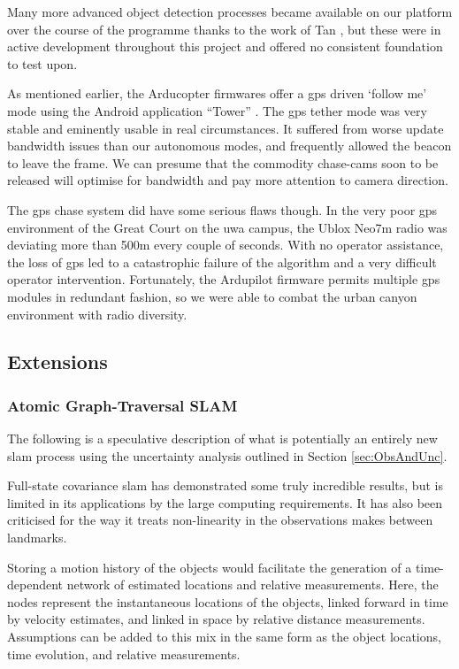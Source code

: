 \documentclass[a4paper, 11pt, titlepage]{article}
\newcounter{subsubsubsection}[subsubsection]
\begin{document}
        Many more advanced object detection processes became available on our platform over the course of the programme thanks to the work of Tan \cite{Tan}, but these were in active development throughout this project and offered no consistent foundation to test upon.

        As mentioned earlier, the Arducopter firmwares offer a \gls{gps} driven `follow me' mode using the Android application ``Tower'' \cite{3dr-tower}.
        The \gls{gps} tether mode was very stable and eminently usable in real circumstances.  It suffered from worse update bandwidth issues than our autonomous modes, and frequently allowed the beacon to leave the frame.  We can presume that the commodity chase-cams soon to be released will optimise for bandwidth and pay more attention to camera direction.

        The \gls{gps} chase system did have some serious flaws though.  In the very poor \gls{gps} environment of the Great Court on the \gls{uwa} campus, the Ublox Neo7m radio was deviating more than 500m every couple of seconds.  With no operator assistance, the loss of \gls{gps} led to a catastrophic failure of the algorithm and a very difficult operator intervention.  Fortunately, the Ardupilot firmware permits multiple \gls{gps} modules in redundant fashion, so we were able to combat the urban canyon environment with radio diversity.

    \subsection{Extensions}

      \subsubsection{Atomic Graph-Traversal SLAM}
      \label{sec:SLAMproposal}
        The following is a speculative description of what is potentially an entirely new \gls{slam} process using the uncertainty analysis outlined in Section \ref{sec:ObsAndUnc}.

        Full-state covariance \gls{slam} has demonstrated some truly incredible results, but is limited in its applications by the large computing requirements.  It has also been criticised for the way it treats non-linearity in the observations makes between landmarks.

        Storing a motion history of the objects would facilitate the generation of a time-dependent network of estimated locations and relative measurements.
        Here, the nodes represent the instantaneous locations of the objects, linked forward in time by velocity estimates, and linked in space by relative distance measurements.  Assumptions can be added to this mix in the same form as the object locations, time evolution, and relative measurements.
\end{document}
